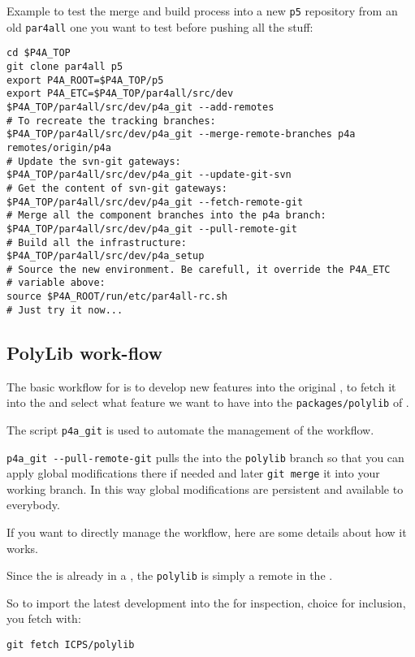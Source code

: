 \documentclass[a4paper]{article}
\begin{document}
Example to test the merge and build process into a new \texttt{p5}
repository from an old \texttt{par4all} one you want to test before
pushing all the stuff:
\begin{verbatim}
cd $P4A_TOP
git clone par4all p5
export P4A_ROOT=$P4A_TOP/p5
export P4A_ETC=$P4A_TOP/par4all/src/dev
$P4A_TOP/par4all/src/dev/p4a_git --add-remotes
# To recreate the tracking branches:
$P4A_TOP/par4all/src/dev/p4a_git --merge-remote-branches p4a remotes/origin/p4a
# Update the svn-git gateways:
$P4A_TOP/par4all/src/dev/p4a_git --update-git-svn
# Get the content of svn-git gateways:
$P4A_TOP/par4all/src/dev/p4a_git --fetch-remote-git
# Merge all the component branches into the p4a branch:
$P4A_TOP/par4all/src/dev/p4a_git --pull-remote-git
# Build all the infrastructure:
$P4A_TOP/par4all/src/dev/p4a_setup
# Source the new environment. Be carefull, it override the P4A_ETC
# variable above:
source $P4A_ROOT/run/etc/par4all-rc.sh
# Just try it now...
\end{verbatim}


\subsection{PolyLib work-flow}
\label{sec:polylib-workflow}

The basic workflow for \Apolylib is to develop new features into the
original \Apolylib{} \Agit, to fetch it into the \Apfa{} \Agit and select what
feature we want to have into the \texttt{packages/polylib} of \Apfa.

The script \verb|p4a_git| is used to automate the management of the
workflow.

\verb|p4a_git --pull-remote-git| pulls the \Apolylib into the
\texttt{polylib} branch so that you can apply global modifications there
if needed and later \texttt{git merge} it into your working branch. In
this way global modifications are persistent and available to everybody.

If you want to directly manage the \Apolylib workflow, here are some
details about how it works.

Since the \Apolylib is already in a \Agit, the \texttt{polylib} is simply
a remote in the \Apfa{} \Agit.

So to import the latest \Apolylib development into the \Apfa{} \Agit for
inspection, choice for inclusion, you fetch \Apolylib with:
\begin{verbatim}
git fetch ICPS/polylib
\end{verbatim}
\end{document}
